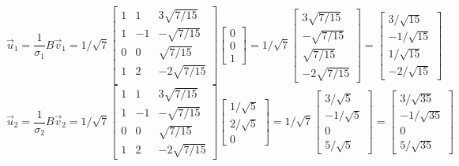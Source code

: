 \documentclass{report}
\begin{document}
$$
\vec{u}_1 = \frac{1}{\sigma_1}B\vec{v}_1 = 1/\sqrt{7}\begin{bmatrix}
1&1&3\sqrt{7/15}\\
1&-1&-\sqrt{7/15}\\
0&0&\sqrt{7/15}\\
1&2&-2\sqrt{7/15}\\
\end{bmatrix}
\begin{bmatrix}0\\0\\1\end{bmatrix} = 1/\sqrt{7}\begin{bmatrix}3\sqrt{7/15}\\-\sqrt{7/15}\\\sqrt{7/15}\\-2\sqrt{7/15}\end{bmatrix} = \begin{bmatrix}3/\sqrt{15}\\-1/\sqrt{15}\\1/\sqrt{15}\\-2/\sqrt{15}\end{bmatrix}
$$
$$
\vec{u}_2  = \frac{1}{\sigma_2}B\vec{v}_2 = 1/\sqrt{7}
\begin{bmatrix}
1&1&3\sqrt{7/15}\\
1&-1&-\sqrt{7/15}\\
0&0&\sqrt{7/15}\\
1&2&-2\sqrt{7/15}
\end{bmatrix}
\begin{bmatrix}1/\sqrt{5}\\2/\sqrt{5}\\0\end{bmatrix} = 1/\sqrt{7}\begin{bmatrix}3/\sqrt{5}\\-1/\sqrt{5}\\0\\5/\sqrt{5}\end{bmatrix} = \begin{bmatrix} 3/\sqrt{35}\\-1/\sqrt{35}\\0\\5/\sqrt{35}\end{bmatrix}
$$
\end{document}
